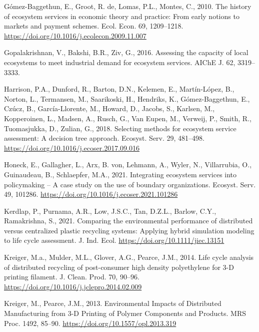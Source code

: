 \documentclass[]{elsarticle} %
\newlength{\cslhangindent}
\newenvironment{CSLReferences}[2] %
 {%
  \setlength{\parindent}{0pt}
  \ifodd #1 \everypar{\setlength{\hangindent}{\cslhangindent}}\ignorespaces\fi
  \ifnum #2 > 0
  \setlength{\parskip}{#2\baselineskip}
  \fi
 }%
 {}
\begin{document}
\begin{CSLReferences}{1}{0}
\leavevmode{}%
Gómez-Baggethun, E., Groot, R. de, Lomas, P.L., Montes, C., 2010. {The history of ecosystem services in economic theory and practice: From early notions to markets and payment schemes}. Ecol. Econ. 69, 1209--1218. \url{https://doi.org/10.1016/j.ecolecon.2009.11.007}

\leavevmode{}%
Gopalakrishnan, V., Bakshi, B.R., Ziv, G., 2016. {Assessing the capacity of local ecosystems to meet industrial demand for ecosystem services}. AIChE J. 62, 3319--3333.

\leavevmode{}%
Harrison, P.A., Dunford, R., Barton, D.N., Kelemen, E., Martín-López, B., Norton, L., Termansen, M., Saarikoski, H., Hendriks, K., Gómez-Baggethun, E., Czúcz, B., García-Llorente, M., Howard, D., Jacobs, S., Karlsen, M., Kopperoinen, L., Madsen, A., Rusch, G., Van Eupen, M., Verweij, P., Smith, R., Tuomasjukka, D., Zulian, G., 2018. {Selecting methods for ecosystem service assessment: A decision tree approach}. Ecosyst. Serv. 29, 481--498. \url{https://doi.org/10.1016/j.ecoser.2017.09.016}

\leavevmode{}%
Honeck, E., Gallagher, L., Arx, B. von, Lehmann, A., Wyler, N., Villarrubia, O., Guinaudeau, B., Schlaepfer, M.A., 2021. {Integrating ecosystem services into policymaking -- A case study on the use of boundary organizations}. Ecosyst. Serv. 49, 101286. \url{https://doi.org/10.1016/j.ecoser.2021.101286}

\leavevmode{}%
Kerdlap, P., Purnama, A.R., Low, J.S.C., Tan, D.Z.L., Barlow, C.Y., Ramakrishna, S., 2021. {Comparing the environmental performance of distributed versus centralized plastic recycling systems: Applying hybrid simulation modeling to life cycle assessment}. J. Ind. Ecol. \url{https://doi.org/10.1111/jiec.13151}

\leavevmode{}%
Kreiger, M.a., Mulder, M.L., Glover, A.G., Pearce, J.M., 2014. {Life cycle analysis of distributed recycling of post-consumer high density polyethylene for 3-D printing filament}. J. Clean. Prod. 70, 90--96. \url{https://doi.org/10.1016/j.jclepro.2014.02.009}

\leavevmode{}%
Kreiger, M., Pearce, J.M., 2013. {Environmental Impacts of Distributed Manufacturing from 3-D Printing of Polymer Components and Products}. MRS Proc. 1492, 85--90. \url{https://doi.org/10.1557/opl.2013.319}


\end{CSLReferences}
\end{document}
